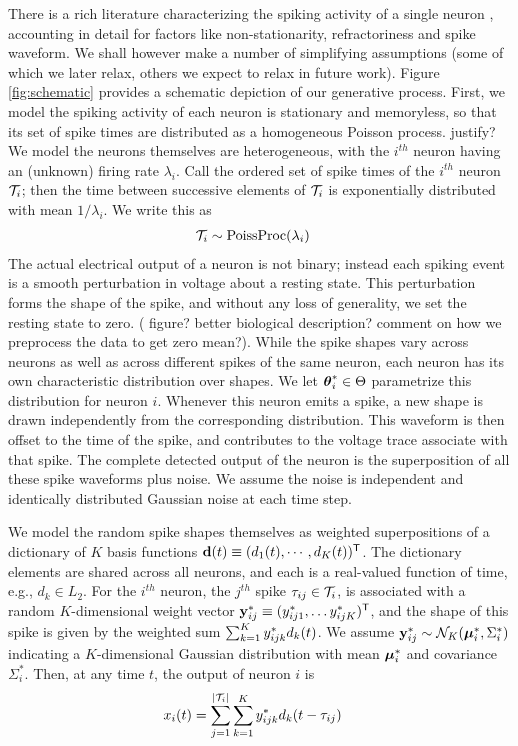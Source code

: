There is a rich literature characterizing the spiking activity of a single neuron \citep{}, accounting in detail for factors like non-stationarity, 
refractoriness and spike waveform. We shall however make a number of simplifying assumptions (some of which we later relax, others we expect to relax in future work). Figure \ref{fig:schematic} provides a schematic depiction of our generative process.
First, we model the spiking activity of each neuron is 
stationary and memoryless, so that its set of spike times are 
distributed as a homogeneous Poisson process. 
{\color{red} justify?} We model the neurons themselves are heterogeneous, with the $i^{th}$ neuron having
an (unknown) firing rate $\lambda_i$. Call the ordered set of spike times of the $i^{th}$ neuron $\mathcal{T}_i$; then the time between successive elements of $\mathcal{T}_i$ is 
exponentially distributed with mean $1/\lambda_i$. We write this as
\begin{align}
  \mathcal{T}_i &\sim \text{PoissProc}(\lambda_i)
\end{align}
The actual electrical output of a neuron is not binary; instead each spiking event is a smooth perturbation in voltage about a
resting state. This perturbation forms the shape of the spike, and without any loss of generality, we set the resting state to zero. 
{(\color{red} figure? better biological description? comment on how we preprocess the data to get zero mean?)}. 
While the spike shapes vary across neurons as well as across different spikes of the same neuron, each 
neuron has its own characteristic distribution over shapes. 
We let $\boldsymbol{\theta}^*_i \in \Theta$ parametrize this distribution for neuron $i$.
Whenever this neuron emits a 
spike, a new shape is drawn independently from the corresponding distribution. %
This waveform is then offset to the time of the spike, and contributes to the voltage trace associate with that spike. The complete detected output of the neuron is the 
superposition of all these spike waveforms plus noise.  
We assume the noise is independent and  identically distributed Gaussian noise at each time step.

We model the random spike shapes themselves as weighted superpositions of a dictionary of $K$ basis functions $\mathbf{d}(t) \equiv (d_1(t), \cdots, d_K(t))^{\mathsf{T}}$. The
dictionary elements are shared across all neurons, and each is a real-valued function of time, e.g., $d_k \in L_2$.
For the $i^{th}$ neuron, the $j^{th}$ spike $\tau_{ij} \in \mathcal{T}_i$, is associated with a random $K$-dimensional weight vector $\mathbf{y}^*_{ij} \equiv (y^*_{ij1}, \ldots y^*_{ijK})^{\mathsf{T}}$, and the 
shape of this spike is given by the weighted sum $\sum_{k=1}^K y^*_{ijk} d_k(t)$. We assume $\mathbf{y}^*_{ij} \sim \mathcal{N}_K(\boldsymbol{\mu}^*_i, \Sigma^*_i)$ indicating a $K$-dimensional Gaussian distribution with mean $\boldsymbol{\mu}^*_i$ and covariance $\Sigma^*_i$.   Then, at any time $t$, the output of neuron $i$ is
\begin{align}
  x_{i}(t) &= \sum_{j=1}^{|\mathcal{T}_i|} \sum_{k=1}^K y^*_{ijk} d_k(t - \tau_{ij})
\end{align}



